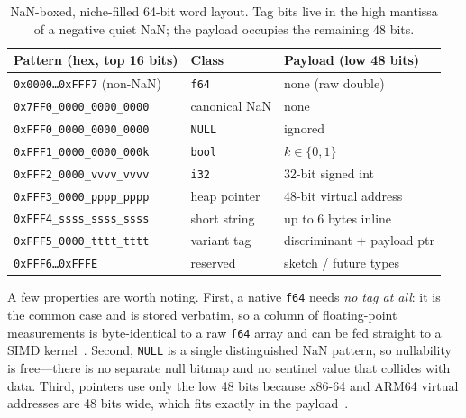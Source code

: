 \documentclass[10pt]{article}
\begin{document}
\begin{table}[t]
\centering
\caption{NaN-boxed, niche-filled 64-bit word layout. Tag bits live in
the high mantissa of a negative quiet NaN; the payload occupies the
remaining 48 bits.}
\label{tab:nanbox}
\small
\begin{tabular}{@{}lll@{}}
\toprule
Pattern (hex, top 16 bits) & Class & Payload (low 48 bits) \\
\midrule
\texttt{0x0000\dots0xFFF7} (non-NaN) & \texttt{f64} & none (raw double) \\
\texttt{0x7FF0\_0000\_0000\_0000}    & canonical NaN & none \\
\texttt{0xFFF0\_0000\_0000\_0000}    & \texttt{NULL} & ignored \\
\texttt{0xFFF1\_0000\_0000\_000k}    & \texttt{bool} & $k\in\{0,1\}$ \\
\texttt{0xFFF2\_0000\_vvvv\_vvvv}    & \texttt{i32}  & 32-bit signed int \\
\texttt{0xFFF3\_0000\_pppp\_pppp}    & heap pointer  & 48-bit virtual address \\
\texttt{0xFFF4\_ssss\_ssss\_ssss}    & short string  & up to 6 bytes inline \\
\texttt{0xFFF5\_0000\_tttt\_tttt}    & variant tag   & discriminant + payload ptr \\
\texttt{0xFFF6\dots0xFFFE}           & reserved      & sketch / future types \\
\bottomrule
\end{tabular}
\end{table}

A few properties are worth noting. First, a native \texttt{f64} needs
\emph{no tag at all}: it is the common case and is stored verbatim, so
a column of floating-point measurements is byte-identical to a raw
\texttt{f64} array and can be fed straight to a SIMD
kernel~\citep{willhalm2009simd,polychroniou2015arithmetic}. Second,
\texttt{NULL} is a single distinguished NaN pattern, so nullability is
free---there is no separate null bitmap and no sentinel value that
collides with data. Third, pointers use only the low 48 bits because
x86-64 and ARM64 virtual addresses are 48 bits wide, which fits exactly
in the payload~\citep{wingo2011value}.
\end{document}

